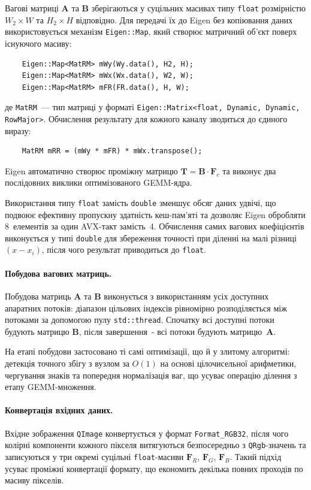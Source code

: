 Вагові матриці $\mathbf{A}$ та $\mathbf{B}$ зберігаються у суцільних масивах типу \texttt{float} розмірністю $W_2 \times W$ та
$H_2 \times H$ відповідно. Для передачі їх до Eigen без копіювання даних
використовується механізм \texttt{Eigen::Map}, який створює матричний
об'єкт поверх існуючого масиву:
\begin{verbatim}
	Eigen::Map<MatRM> mWy(Wy.data(), H2, H);
	Eigen::Map<MatRM> mWx(Wx.data(), W2, W);
	Eigen::Map<MatRM> mFR(FR.data(), H, W);
\end{verbatim}
де \texttt{MatRM}~--- тип матриці у форматі
\texttt{Eigen::Matrix<float, Dynamic, Dynamic, RowMajor>}. Обчислення
результату для кожного каналу зводиться до єдиного виразу:
\begin{verbatim}
	MatRM mRR = (mWy * mFR) * mWx.transpose();
\end{verbatim}
Eigen автоматично створює проміжну матрицю
$\mathbf{T} = \mathbf{B} \cdot \mathbf{F}_c$ та виконує два послідовних
виклики оптимізованого GEMM-ядра.

Використання типу \texttt{float} замість \texttt{double} зменшує обсяг
даних удвічі, що подвоює ефективну пропускну здатність кеш-пам'яті та
дозволяє Eigen обробляти 8~елементів за один AVX-такт замість~4. Обчислення
самих вагових коефіцієнтів виконується у типі \texttt{double} для
збереження точності при діленні на малі різниці $(x - x_i)$, після чого
результат приводиться до \texttt{float}.

\paragraph{Побудова вагових матриць.}
Побудова матриць $\mathbf{A}$ та $\mathbf{B}$ виконується з використанням
усіх доступних апаратних потоків: діапазон цільових індексів рівномірно
розподіляється між потоками за допомогою пулу \texttt{std::thread}.
Спочатку всі доступні потоки будують матрицю $\mathbf{B}$, після завершення~- всі потоки будують
матрицю~$\mathbf{A}$.

На етапі побудови застосовано ті самі оптимізації, що й у злитому
алгоритмі: детекція точного збігу з вузлом за $O(1)$ на основі
цілочисельної арифметики, чергування знаків
та попередня нормалізація ваг, що усуває операцію ділення з етапу
GEMM-множення.

\paragraph{Конвертація вхідних даних.}
Вхідне зображення \texttt{QImage} конвертується у формат
\texttt{Format\_RGB32}, після чого колірні компоненти кожного пікселя
витягуються безпосередньо з \texttt{QRgb}-значень та записуються у три
окремі суцільні \texttt{float}-масиви $\mathbf{F}_R$, $\mathbf{F}_G$,
$\mathbf{F}_B$. Такий підхід усуває проміжні конвертації формату, що економить декілька повних проходів по масиву пікселів.

